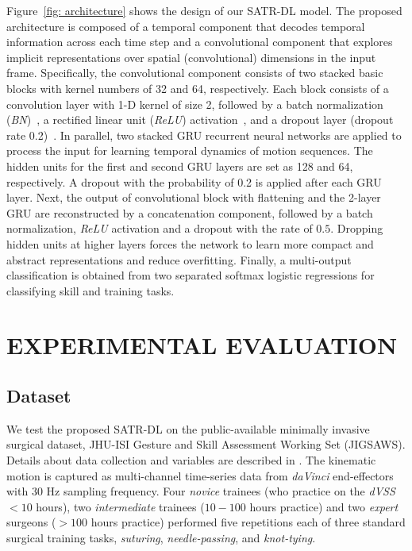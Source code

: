 \documentclass[letterpaper, 10 pt, conference, twoside]{IEEEtran}
\begin{document}
Figure~\ref{fig: architecture} shows the design of our SATR-DL model. The proposed architecture is composed of a temporal component that decodes temporal information across each time step and a convolutional component that explores implicit representations over spatial (convolutional) dimensions in the input frame. 
Specifically, the convolutional component consists of two stacked basic blocks with kernel numbers of 32 and 64, respectively.
Each block consists of a convolution layer with 1-D kernel of size 2, followed by a batch normalization (\textit{BN})~\cite{ioffe2015batch}, a rectified linear unit (\textit{ReLU}) activation~\cite{nair2010relu}, and a dropout layer (dropout rate 0.2)~\cite{srivastava2014dropout}. 
In parallel, two stacked GRU recurrent neural networks are applied to process the input for learning temporal dynamics of motion sequences. The hidden units for the first and second GRU layers are set as 128 and 64, respectively. A dropout with the probability of 0.2 is applied after each GRU layer. Next, the output of convolutional block with flattening and the 2-layer GRU are reconstructed by a concatenation component, followed by a batch normalization, \textit{ReLU} activation and a dropout with the rate of $0.5$. Dropping hidden units at higher layers forces the network to learn more compact and abstract representations and reduce overfitting. Finally, a multi-output classification is obtained from two separated softmax logistic regressions for classifying skill and training tasks.

\section{EXPERIMENTAL EVALUATION}
\subsection{Dataset}
We test the proposed SATR-DL on the public-available minimally invasive surgical dataset, JHU-ISI Gesture and Skill Assessment Working Set (JIGSAWS). Details about data collection and variables are described in \cite{gao2014JIGSAW}. The kinematic motion is captured as multi-channel time-series data from \textit{daVinci} end-effectors with 30 Hz sampling frequency. Four \textit{novice} trainees (who practice on the \textit{dVSS} $<10$ hours), two \textit{intermediate} trainees ($10-100$ hours practice) and two \textit{expert} surgeons ($>100$ hours practice) performed five repetitions each of three standard surgical training tasks, \textit{suturing}, \textit{needle-passing}, and \textit{knot-tying}.
\end{document}
